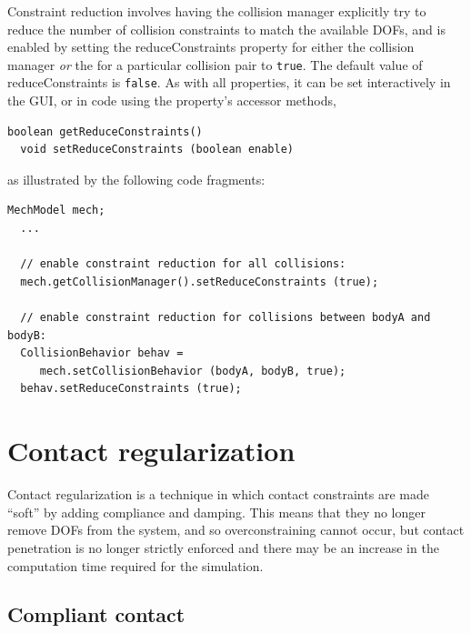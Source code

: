 Constraint reduction involves having the collision manager explicitly
try to reduce the number of collision constraints to match the
available DOFs, and is enabled by setting the {\sf reduceConstraints}
property for either the collision manager
{\it or} the 
for a particular collision pair to {\tt true}. The default value of
{\sf reduceConstraints} is {\tt false}. As with all properties, it can
be set interactively in the GUI, or in code using the property's
accessor methods,
%
\begin{lstlisting}[]
  boolean getReduceConstraints()
  void setReduceConstraints (boolean enable)
\end{lstlisting}
%
as illustrated by the following code fragments:
%
\begin{lstlisting}[]
  MechModel mech;
  ...

  // enable constraint reduction for all collisions:
  mech.getCollisionManager().setReduceConstraints (true);

  // enable constraint reduction for collisions between bodyA and bodyB:
  CollisionBehavior behav = 
     mech.setCollisionBehavior (bodyA, bodyB, true);
  behav.setReduceConstraints (true);
\end{lstlisting}
%

\section{Contact regularization}
\label{ContactRegularization:sec}

Contact regularization is a technique in which contact
constraints are made ``soft'' by adding compliance and damping.  This
means that they no longer remove DOFs from the system, and so
overconstraining cannot occur, but contact penetration is no longer
strictly enforced and there may be an increase in the computation time
required for the simulation. 

\subsection{Compliant contact}
\label{CompliantContact:sec}

